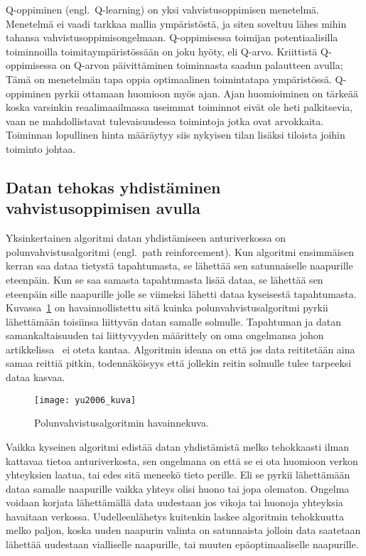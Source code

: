 Q-oppiminen (engl.\ Q-learning) on yksi vahvistusoppimisen menetelmä. Menetelmä
ei vaadi tarkkaa mallia ympäristöstä, ja siten soveltuu lähes mihin tahansa
vahvistusoppimisongelmaan.  Q-oppimisessa toimijan potentiaalisilla
toiminnoilla toimitaympäristössään on joku hyöty, eli Q-arvo. Kriittistä
Q-oppimisessa on Q-arvon päivittäminen toiminnasta saadun palautteen avulla;
Tämä on menetelmän tapa oppia optimaalinen toimintatapa ympäristössä.
Q-oppiminen pyrkii ottamaan huomioon myös ajan. Ajan huomioiminen on tärkeää
koska varsinkin reaalimaailmassa useimmat toiminnot eivät ole heti palkitsevia,
vaan ne mahdollistavat tulevaisuudessa toimintoja jotka ovat arvokkaita.
Toiminnan lopullinen hinta määräytyy siis nykyisen tilan lisäksi tiloista
joihin toiminto johtaa.~\parencite{Kaelbling1996}

\subsection{Datan tehokas yhdistäminen vahvistusoppimisen avulla}

Yksinkertainen algoritmi datan yhdistämiseen anturiverkossa on polunvahvistusalgoritmi
(engl.\ path reinforcement).
Kun algoritmi ensimmäisen kerran saa dataa tietystä
tapahtumasta, se lähettää sen satunnaiselle naapurille eteenpäin. Kun se saa
samasta tapahtumasta lisää dataa, se lähettää sen eteenpäin sille naapurille
jolle se viimeksi lähetti dataa kyseisestä tapahtumasta.  Kuvassa~\ref{fig:yu2006} on
havainnollistettu sitä kuinka polunvahvistusalgoritmi pyrkii lähettämään
toisiinsa liittyvän datan samalle solmulle. Tapahtuman ja datan
samankaltaisuuden tai liittyvyyden määrittely on oma ongelmansa johon
artikkelissa~\cite{Yu2006} ei oteta kantaa. Algoritmin ideana on että jos data
reititetään aina samaa reittiä pitkin, todennäköisyys että jollekin reitin
solmulle tulee tarpeeksi dataa kasvaa.

\begin{figure}[h]
  \centering
  \texttt{[image: yu2006\_kuva]}
  \caption{Polunvahvistusalgoritmin havainnekuva.~\parencite{Yu2006}}
\label{fig:yu2006}
\end{figure}

Vaikka kyseinen algoritmi edistää datan yhdistämistä melko tehokkaasti ilman kattavaa
tietoa anturiverkosta, sen ongelmana on että se ei ota huomioon verkon
yhteyksien laatua, tai edes sitä meneekö tieto perille. Eli se pyrkii
lähettämään dataa samalle naapurille vaikka yhteys olisi huono tai jopa
olematon. Ongelma voidaan korjata lähettämällä data uudestaan jos vikoja tai
huonoja yhteyksia havaitaan verkossa. Uudelleenlähetys kuitenkin laskee
algoritmin tehokkuutta melko paljon, koska uuden naapurin valinta on
satunnaista jolloin data saatetaan lähettää uudestaan vialliselle naapurille,
tai muuten epäoptimaaliselle naapurille.


